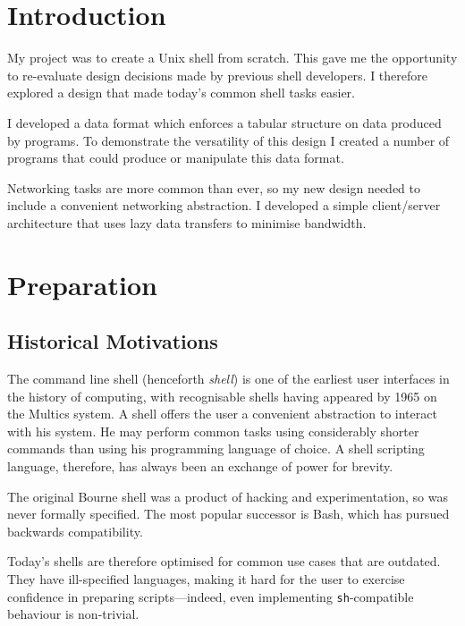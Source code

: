 \documentclass[12pt,twoside,notitlepage]{report}
\begin{document}
\cleardoublepage        %

\setcounter{page}{1}
\pagestyle{headings}

\chapter{Introduction}
My project was to create a Unix shell from scratch. This gave me the opportunity
to re-evaluate design decisions made by previous shell developers. I therefore
explored a design that made today's common shell tasks easier.

I developed a data format which enforces a tabular structure on data produced by
programs. To demonstrate the versatility of this design I created a number of
programs that could produce or manipulate this data format.

Networking tasks are more common than ever, so my new design needed to include a
convenient networking abstraction. I developed a simple client/server
architecture that uses lazy data transfers to minimise bandwidth.


\cleardoublepage

\chapter{Preparation}

\section{Historical Motivations}
The command line shell (henceforth \emph{shell}) is one of the earliest user
interfaces in the history of computing, with recognisable shells having appeared
by 1965 \cite{multics} on the Multics system. A shell offers the user a
convenient abstraction to interact with his system. He may perform common tasks
using considerably shorter commands than using his programming language of
choice. A shell scripting language, therefore, has always been an exchange of
power for brevity.

The original Bourne shell was a product of hacking and experimentation, so was
never formally specified. The most popular successor is Bash, which has pursued
backwards compatibility.

Today's shells are therefore optimised for common use cases that are
outdated. They have ill-specified languages, making it hard for the user to
exercise confidence in preparing scripts---indeed, even implementing
\texttt{sh}-compatible behaviour is non-trivial\cite{bourne}.
\end{document}
